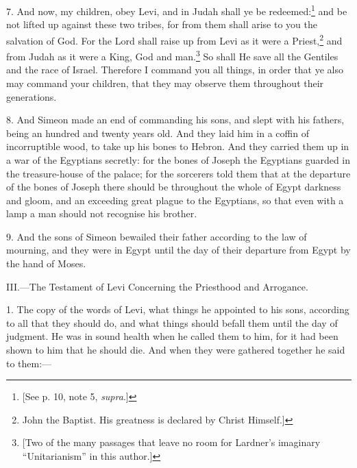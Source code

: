 7. And now, my children, obey Levi, and in Judah shall ye be redeemed:\footnote{[See p. 10, note 5, \emph{supra}.]} and be not lifted up against these two tribes, for from them shall arise to you the salvation of God. For the Lord shall raise up from Levi as it were a Priest,\footnote{John the Baptist. His greatness is declared by Christ Himself.]} and from Judah as it were a King, God and man.\footnote{[Two of the many passages that leave no room for Lardner’s imaginary “Unitarianism” in this author.]} So shall He save all the Gentiles and the race of Israel. Therefore I command you all things, in order that ye also may command your children, that they may observe them throughout their generations.

8. And Simeon made an end of commanding his sons, and slept with his fathers, being an hundred and twenty years old. And they laid him in a coffin of incorruptible wood, to take up his bones to Hebron. And they carried them up in a war of the Egyptians secretly: for the bones of Joseph the Egyptians guarded in the treasure-house of the palace; for the sorcerers told them that at the departure of the bones of Joseph there should be throughout the whole of Egypt darkness and gloom, and an exceeding great plague to the Egyptians, so that even with a lamp a man should not recognise his brother.

9. And the sons of Simeon bewailed their father according to the law of mourning, and they were in Egypt until the day of their departure from Egypt by the hand of Moses.


III.—The Testament of Levi Concerning the Priesthood and Arrogance.

1. The copy of the words of Levi, what things he appointed to his sons, according to all that they should do, and what things should befall them until the day of judgment. He was in sound health when he called them to him, for it had been shown to him that he should die. And when they were gathered together he said to them:—

